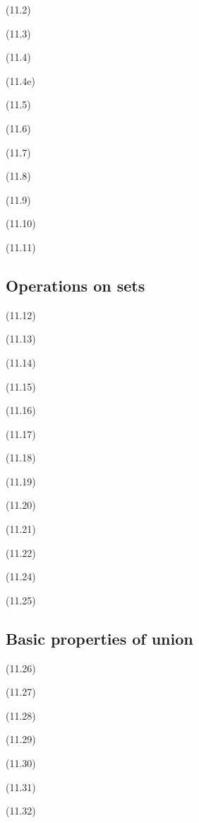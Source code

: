 \documentclass[a4paper,10pt]{article}
\newenvironment{theoremlist}{
\begin{description}
  \setlength{\itemsep}{1.5pt}
  \setlength{\parskip}{0pt}
  \setlength{\parsep}{0pt}
}{\end{description}}
\begin{document}
\begin{theoremlist}
\item[(11.2)]									$  $
\item[(11.3)]									$  $
\item[(11.4)]									$  $
\item[(11.4e)]									$  $
\item[(11.5)]									$  $
\item[(11.6)]									$  $
\item[(11.7)]									$  $
\item[(11.8)]									$  $
\item[(11.9)]									$  $
\item[(11.10)]									$  $
\item[(11.11)]									$  $
\end{theoremlist}

\subsection{Operations on sets}

\begin{theoremlist}
\item[(11.12)]									$  $
\item[(11.13)]									$  $
\item[(11.14)]									$  $
\item[(11.15)]									$  $
\item[(11.16)]									$  $
\item[(11.17)]									$  $
\item[(11.18)]									$  $
\item[(11.19)]									$  $
\item[(11.20)]									$  $
\item[(11.21)]									$  $
\item[(11.22)]									$  $
\item[(11.24)]									$  $
\item[(11.25)]									$  $
\end{theoremlist}

\subsection{Basic properties of union}
\begin{theoremlist}
\item[(11.26)]									$  $
\item[(11.27)]									$  $
\item[(11.28)]									$  $
\item[(11.29)]									$  $
\item[(11.30)]									$  $
\item[(11.31)]									$  $
\item[(11.32)]									$  $
\end{theoremlist}
\end{document}
